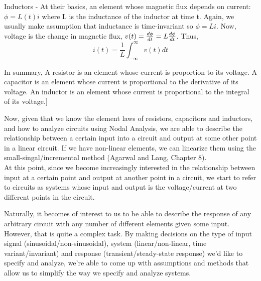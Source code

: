 \documentclass{report}
\begin{document}
Inductors - At their basics, an element whose magnetic flux depends on current: $\phi = L(t) i$ where L is the inductance of the inductor at time t. Again, we usually make assumption that inductance is time-invariant so $\phi = L i$.
Now, voltage is the change in magnetic flux, $v(t) = \dv{\phi}{t} = L \dv{\phi}{t}$. Thus, $$i(t) = \frac{1}{L} \int_{-\infty}^{\infty} v(t) dt$$

In summary,
A resistor is an element whose current is proportion to its voltage.
A capacitor is an element whose current is proportional to the derivative of its voltage.
An inductor is an element whose current is proportional to the integral of its voltage.]


Now, given that we know the element laws of resistors, capacitors and inductors, and how to analyze circuits using Nodal Analysis, we are able to describe the relationship between a certain input into a circuit and output at some other point in a linear circuit. If we have non-linear elements, we can linearize them using the small-singal/incremental method (Agarwal and Lang, Chapter 8).\\
At this point, since we become increasingly interested in the relationship between input at a certain point and output at another point in a circuit, we start to refer to circuits as systems whose input and output is the voltage/current at two different points in the circuit.

Naturally, it becomes of interest to us to be able to describe the response of any arbitrary circuit with any number of different elements given some input. However, that is quite a complex task. By making decisions on the type of input signal (sinusoidal/non-sinusoidal), system (linear/non-linear, time variant/invariant) and response (transient/steady-state response) we'd like to specify and analyze, we're able to come up with assumptions and methods that allow us to simplify the way we specify and analyze systems. 
\end{document}
